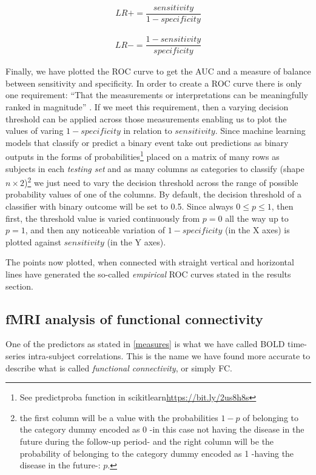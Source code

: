 \documentclass[a4paper,12pt]{elsarticle}  %
\begin{document}
\begin{align}
LR+ = \dfrac{sensitivity}{1 - specificity}
\end{align}

\begin{align}
LR- =\dfrac{1 - sensitivity}{specificity}
\end{align}

Finally, we have plotted the ROC curve to get the AUC and a measure of balance between sensitivity and specificity. In order to create a ROC curve there is only one requirement: ``That the measurements or interpretations can be meaningfully ranked in magnitude'' \cite{john2011}. If we meet this requirement, then a varying decision threshold can be applied across those measurements enabling us to plot the values of varing $1 - specificity$  in relation to $ sensitivity$. Since machine learning models that classify or predict a binary event take out predictions as binary outputs in the forms of probabilities\footnote{See predictproba function in scikitlearn\href{https://bit.ly/2us8h8s}{https://bit.ly/2us8h8s}} placed on a matrix of many rows as subjects in each \textit{testing set} and as many columns as categories to classify (shape $n \times 2$)\footnote{the first column will be a value with the probabilities $ 1 - p $ of belonging to the category dummy encoded as 0 -in this case not having the disease in the future during the follow-up period- and the right column will be the probability of belonging to the category dummy encoded as 1 -having the disease in the future-: $p$.} we just need to vary the decision threshold across the range of possible probability values of one of the columns. By default, the decision threshold of a classifier with binary outcome will be set to 0.5. Since always $0 \leq p \leq 1$, then first, the threshold value  is varied continuously from $p = 0$ all the way up to $p = 1$, and then any noticeable variation of $1 - specificity$ (in the X axes) is plotted against $sensitivity$ (in the Y axes). 

The points now plotted, when connected with straight vertical and horizontal lines have generated the so-called \textit{empirical} ROC curves\cite{john2011} stated in the results section.


\subsection{fMRI analysis of functional connectivity}\label{estadistica-fcon}


One of the predictors as stated in \ref{measures} is what we have called BOLD time-series intra-subject correlations. This is the name we have found more accurate to describe what is called \textit{functional connectivity}, or simply FC.
\end{document}

